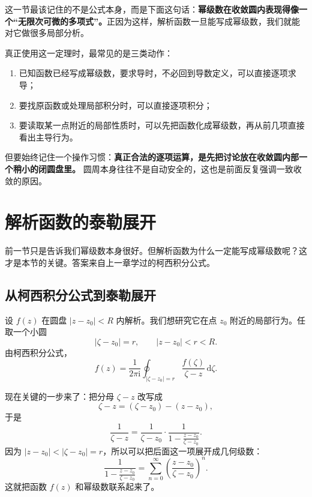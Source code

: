 \begin{tishi}[这一定理为什么重要]
这一节最该记住的不是公式本身，而是下面这句话：\textbf{幂级数在收敛圆内表现得像一个``无限次可微的多项式''。}正因为这样，解析函数一旦能写成幂级数，我们就能对它做很多局部分析。
\end{tishi}

\begin{tishi}[做题时怎么使用这一定理]
真正使用这一定理时，最常见的是三类动作：
\begin{enumerate}
    \item 已知函数已经写成幂级数，要求导时，不必回到导数定义，可以直接逐项求导；
    \item 要找原函数或处理局部积分时，可以直接逐项积分；
    \item 要读取某一点附近的局部性质时，可以先把函数化成幂级数，再从前几项直接看出主导行为。
\end{enumerate}

但要始终记住一个操作习惯：\textbf{真正合法的逐项运算，是先把讨论放在收敛圆内部一个稍小的闭圆盘里。} 圆周本身往往不是自动安全的，这也是前面反复强调一致收敛的原因。
\end{tishi}

\section{解析函数的泰勒展开}

\begin{wulibj}[本节的核心问题]
前一节只是告诉我们幂级数本身很好。但解析函数为什么一定能写成幂级数呢？这才是本节的关键。答案来自上一章学过的柯西积分公式。
\end{wulibj}

\subsection{从柯西积分公式到泰勒展开}

设 $f(z)$ 在圆盘 $|z-z_0|<R$ 内解析。我们想研究它在点 $z_0$ 附近的局部行为。任取一个小圆
\[
    |\zeta-z_0|=r,\qquad |z-z_0|<r<R.
\]
由柯西积分公式，
\[
    f(z)=\frac{1}{2\pi \mathrm{i}}\oint_{|\zeta-z_0|=r}\frac{f(\zeta)}{\zeta-z}\,\mathrm{d}\zeta.
\]

现在关键的一步来了：把分母 $\zeta-z$ 改写成
\[
    \zeta-z = (\zeta-z_0)-(z-z_0),
\]
于是
\[
    \frac{1}{\zeta-z}
    = \frac{1}{\zeta-z_0}\cdot
    \frac{1}{1-\frac{z-z_0}{\zeta-z_0}}.
\]
因为 $|z-z_0|<|\zeta-z_0|=r$，所以可以把后面这一项展开成几何级数：
\[
    \frac{1}{1-\frac{z-z_0}{\zeta-z_0}}
    = \sum_{n=0}^{\infty}\left(\frac{z-z_0}{\zeta-z_0}\right)^n.
\]
这就把函数 $f(z)$ 和幂级数联系起来了。

